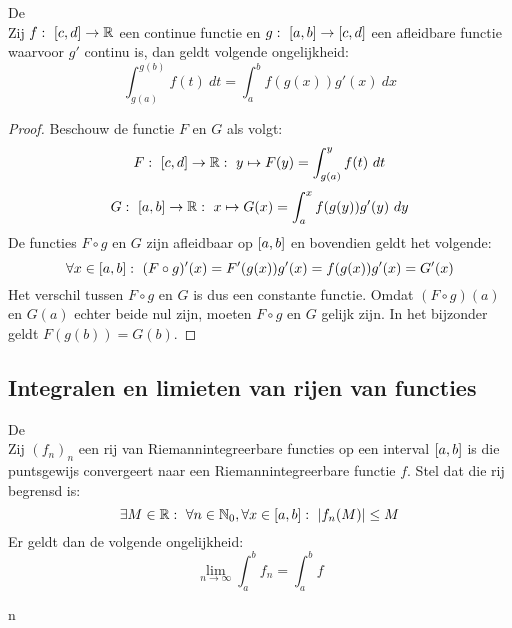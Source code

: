 \documentclass[main.tex]{subfiles}
\begin{document}
\begin{bpr}
  De \\
  Zij $f:\ \interval{c}{d}\rightarrow\mathbb{R}$ een continue functie en $g:\ \interval{a}{b} \rightarrow \interval{c}{d}$ een afleidbare functie waarvoor $g'$ continu is, dan geldt volgende ongelijkheid:
  \[ \int_{g(a)}^{g(b)}f(t)\ dt = \int_{a}^{b}f(g(x))g'(x)\ dx \]

  \begin{proof}
    Beschouw de functie $F$ en $G$ als volgt:
    \[ F:\ \interval{c}{d} \rightarrow \mathbb{R}:\ y \mapsto F(y) = \int_{g(a)}^{y}f(t)\ dt \]
    \[ G:\ \interval{a}{b} \rightarrow \mathbb{R}:\ x \mapsto G(x) = \int_{a}^{x}f(g(y))g'(y)\ dy \]
    De functies $F \circ g$ en $G$ zijn afleidbaar op $\interval{a}{b}$ en bovendien geldt het volgende:
    \[ \forall x\in\interval{a}{b}:\ (F \circ g)'(x) = F'(g(x))g'(x) = f(g(x))g'(x) = G'(x) \]
    Het verschil tussen $F\circ g$ en $G$ is dus een constante functie.
    Omdat $(F \circ g)(a)$ en $G(a)$ echter beide nul zijn, moeten $F\circ g$ en $G$ gelijk zijn.
    In het bijzonder geldt $F(g(b)) = G(b)$.
  \end{proof}
\end{bpr}

\subsection{Integralen en limieten van rijen van functies}
\label{sec:integr-en-limi}

\begin{bst}
  De \\
  Zij $(f_{n})_{n}$ een rij van Riemannintegreerbare functies op een interval $\interval{a}{b}$ is die puntsgewijs convergeert naar een Riemannintegreerbare functie $f$.
  Stel dat die rij begrensd is:
  \[ \exists M\in \mathbb{R}:\ \forall n\in \mathbb{N}_{0}, \forall x \in \interval{a}{b}:\ \left|f_{n}(M)\right| \le M \]
  Er geldt dan de volgende ongelijkheid:
  \[ \lim_{n\rightarrow \infty}\int_{a}^{b}f_{n} = \int_{a}^{b}f \]
\zb
\end{bst}

n
\end{document}
